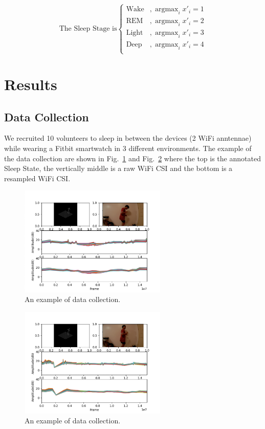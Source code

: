 \documentclass[10pt,letterpaper]{article}
\DeclareMathOperator*{\argmax}{argmax} %
\begin{document}
	
		\begin{equation}
		\text{The Sleep Stage is} \begin{cases}
			\text{Wake} & ,\argmax_i x'_i=1  \\
			\text{REM} & ,\argmax_i x'_i=2  \\
			\text{Light} & ,\argmax_i x'_i=3  \\
			\text{Deep} & ,\argmax_i x'_i=4  \\
		\end{cases}
		\label{eq:SSparserRV}
	\end{equation}	
		
	\section*{Results}
	
	\subsection*{Data Collection}

	We recruited 10 volunteers to sleep in between the devices (2 WiFi anntennae) while wearing a Fitbit smartwatch in 3 different environments. The example of the data collection are shown in Fig.~\ref{fig:VIS02} and Fig.~\ref{fig:VIS03} where the top is the annotated Sleep State, the vertically middle is a raw WiFi CSI and the bottom is a resampled WiFi CSI.
	
	
\begin{figure}[htbp]
	\centerline{\includegraphics[width=70mm,scale=0.2]{VIS02.png}}
	\caption{An example of data collection.}
	\label{fig:VIS02}
\end{figure}
\begin{figure}[htbp]
	\centerline{\includegraphics[width=70mm,scale=0.2]{VIS03.png}}
	\caption{An example of data collection.}
	\label{fig:VIS03}
\end{figure}
\end{document}
